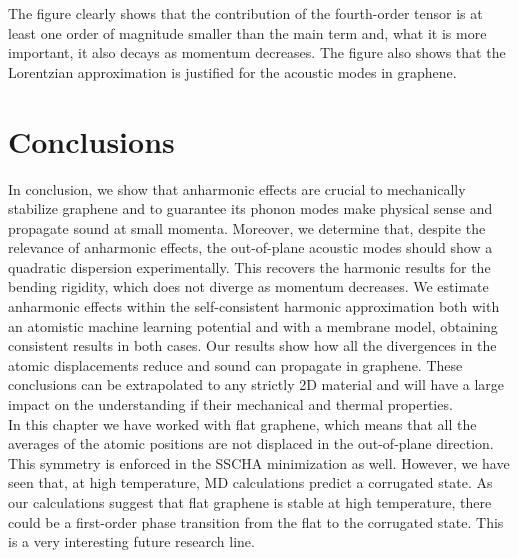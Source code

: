 The figure clearly shows that the contribution of the fourth-order tensor is at least one order of magnitude smaller 
than the main term and, what it is more important, it also decays as momentum decreases. The figure also shows that 
the Lorentzian approximation is justified for the acoustic modes in graphene.

\section{Conclusions}

In conclusion, we show that anharmonic effects are crucial to mechanically stabilize graphene and to guarantee its 
phonon modes make physical sense and propagate sound at small momenta. Moreover, we determine that, despite the 
relevance of anharmonic effects, the out-of-plane acoustic modes should show a quadratic dispersion experimentally. 
This recovers the harmonic results for the bending rigidity, which does not diverge as momentum decreases. 
We estimate anharmonic effects within the self-consistent harmonic approximation both with an atomistic machine 
learning potential and with a membrane model, obtaining consistent results in both cases. Our results show how all 
the divergences in the atomic displacements reduce and sound can propagate in graphene. These conclusions can 
be extrapolated to any strictly 2D material and will have a large impact on the understanding if their mechanical 
and thermal properties. \\

In this chapter we have worked with flat graphene, which means that all the averages of the atomic positions are not 
displaced in the out-of-plane direction. This symmetry is enforced in the SSCHA minimization as well. However, we 
have seen that, at high temperature, MD calculations predict a corrugated state. As our calculations suggest that 
flat graphene is stable at high temperature, there could be a first-order phase transition from the flat to the 
corrugated state. This is a very interesting future research line.
